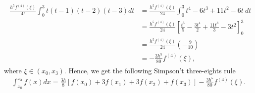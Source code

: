 \documentclass{article}
\begin{document}
\begin{enumerate}
\begin{align}
        \begin{split}
            \frac{h^5f^{(4)}(\xi)}{4!} \int_{0}^{3}t(t-1)(t-2)(t-3)dt
            & = \frac{h^5f^{(4)}(\xi)}{24} \int_{0}^{3}t^4-6t^3+11t^2-6t \ dt
            \\ & = \frac{h^5f^{(4)}(\xi)}{24} \left[\frac{t^5}{5}-\frac{3t^4}{2}+\frac{11t^3}{3}-3t^2\right]_0^3
            \\ & = \frac{h^5f^{(4)}(\xi)}{24} \left(-\frac{9}{10}\right)
            \\ & = -\frac{3h^5}{80}f^{(4)}(\xi),
        \end{split}
    \end{align} where $\xi \in (x_0, x_3)$. Hence, we get the following Simpson't three-eights rule \begin{align}
        \int_{x_0}^{x_3}f(x)dx
        = \frac{3h}{8}[f(x_0)+3f(x_1)+3f(x_2)+f(x_3)] -\frac{3h^5}{80}f^{(4)}(\xi).
    \end{align}

\end{enumerate}
\end{document}
